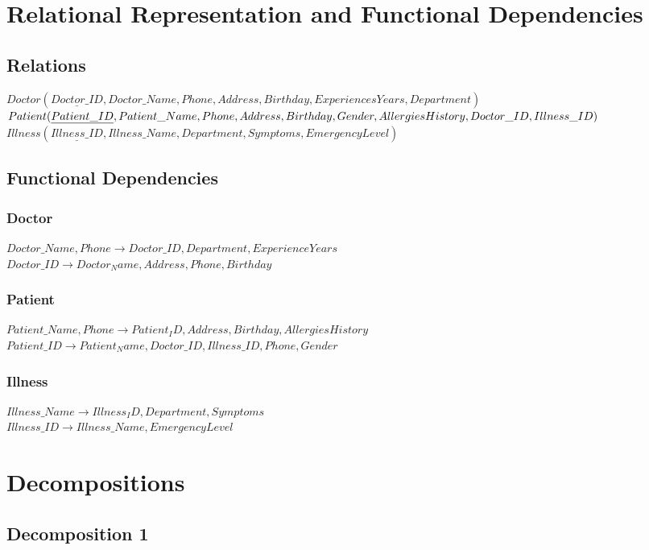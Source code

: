 \documentclass[12pt,arial]{article}
\begin{document}
\section{Relational Representation and Functional Dependencies}
\subsection{Relations}
$Doctor (\underline{Doctor\_ID}, Doctor\_Name, Phone, Address, Birthday, Experiences Years, Department) $\\
$Patient (\underline{Patient\_ID}, Patient\_Name, Phone, Address, Birthday, \\ Gender, Allergies History, Doctor\_ID, Illness\_ID) $\\
$Illness (\underline{Illness\_ID}, Illness\_Name, Department, Symptoms, Emergency Level) $\\
\subsection{Functional Dependencies}
\subsubsection{Doctor}
$Doctor\_Name, Phone \rightarrow Doctor\_ID, Department,Experience Years $\\
$Doctor\_ID \rightarrow Doctor_Name, Address, Phone, Birthday$
\subsubsection{Patient}
$ Patient\_Name, Phone \rightarrow Patient_ID,Address, Birthday, Allergies History $\\
$Patient\_ID \rightarrow Patient_Name,Doctor\_ID,Illness\_ID,Phone,Gender$
\subsubsection{Illness}
$Illness\_Name \rightarrow Illness_ID, Department, Symptoms$\\
$Illness\_ID \rightarrow Illness\_Name, Emergency Level$


\section{Decompositions}
\subsection{Decomposition 1}
\end{document}
